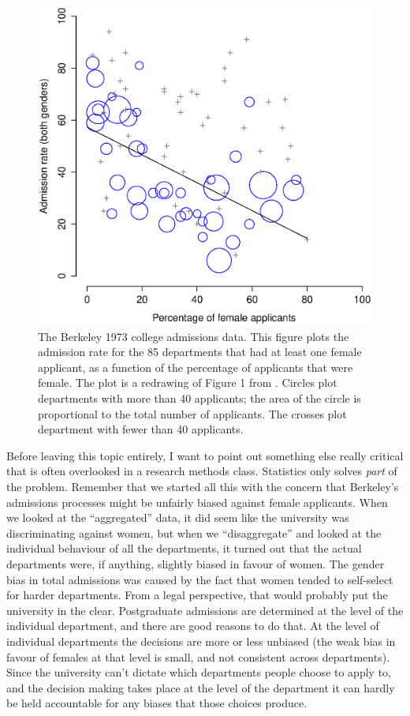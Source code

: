 \documentclass[
]{book}
\begin{document}
\begin{figure}
\centering
\includegraphics{img/whystats/berkeleyadmissions3.eps}
\caption{\label{fig:berkeley}The Berkeley 1973 college admissions data. This figure plots the admission rate for the 85 departments that had at least one female applicant, as a function of the percentage of applicants that were female. The plot is a redrawing of Figure 1 from \citet{Bickel1975}. Circles plot departments with more than 40 applicants; the area of the circle is proportional to the total number of applicants. The crosses plot department with fewer than 40 applicants.}
\end{figure}

Before leaving this topic entirely, I want to point out something else really critical that is often overlooked in a research methods class. Statistics only solves \emph{part} of the problem. Remember that we started all this with the concern that Berkeley's admissions processes might be unfairly biased against female applicants. When we looked at the ``aggregated'' data, it did seem like the university was discriminating against women, but when we ``disaggregate'' and looked at the individual behaviour of all the departments, it turned out that the actual departments were, if anything, slightly biased in favour of women. The gender bias in total admissions was caused by the fact that women tended to self-select for harder departments. From a legal perspective, that would probably put the university in the clear. Postgraduate admissions are determined at the level of the individual department, and there are good reasons to do that. At the level of individual departments the decisions are more or less unbiased (the weak bias in favour of females at that level is small, and not consistent across departments). Since the university can't dictate which departments people choose to apply to, and the decision making takes place at the level of the department it can hardly be held accountable for any biases that those choices produce.
\end{document}
